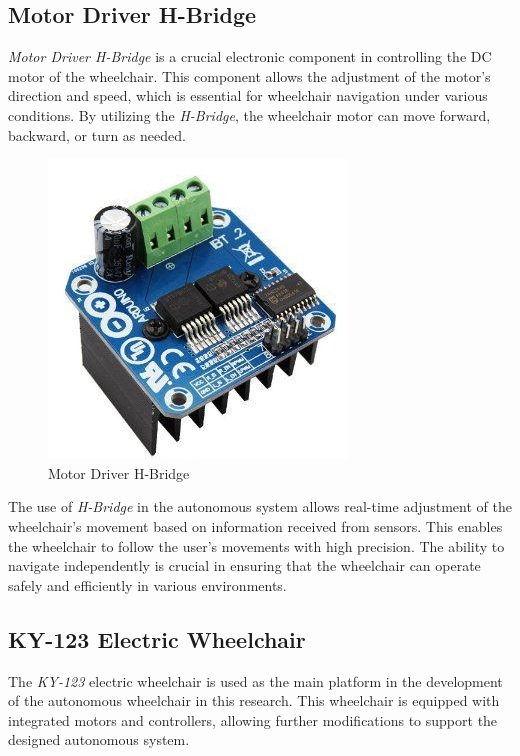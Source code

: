 \subsection{Motor Driver H-Bridge}
\label{subsec:Motor}

\emph{Motor Driver H-Bridge} is a crucial electronic component in controlling the DC motor of the wheelchair. This component allows the adjustment of the motor's direction and speed, which is essential for wheelchair navigation under various conditions. By utilizing the \emph{H-Bridge}, the wheelchair motor can move forward, backward, or turn as needed.

\begin{figure}[H]
  \centering
  \includegraphics[scale=0.4]{gambar/Motor Driver H - bridge Bts.jpg}
  \caption{Motor Driver H-Bridge}
  \label{fig:MotorDriverH-Bridge}
\end{figure}

The use of \emph{H-Bridge} in the autonomous system allows real-time adjustment of the wheelchair's movement based on information received from sensors. This enables the wheelchair to follow the user's movements with high precision. The ability to navigate independently is crucial in ensuring that the wheelchair can operate safely and efficiently in various environments.

\subsection{KY-123 Electric Wheelchair}
\label{subsec:KY-123}

The \emph{KY-123} electric wheelchair is used as the main platform in the development of the autonomous wheelchair in this research. This wheelchair is equipped with integrated motors and controllers, allowing further modifications to support the designed autonomous system.

